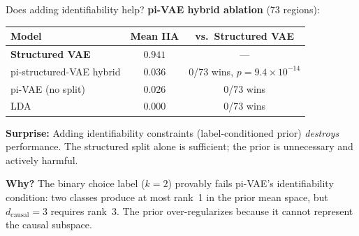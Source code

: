 \documentclass[aspectratio=169,11pt]{beamer}
\begin{document}
\begin{frame}{Does adding identifiability help?}
\textbf{pi-VAE hybrid ablation} (73 regions):

\vspace{0.5em}
\centering
{\small
\begin{tabular}{lcc}
\toprule
\textbf{Model} & \textbf{Mean IIA} & \textbf{vs.\ Structured VAE} \\
\midrule
\textbf{Structured VAE} & $\mathbf{0.941}$ & --- \\
pi-structured-VAE hybrid & $0.036$ & 0/73 wins, $p = 9.4 \times 10^{-14}$ \\
pi-VAE (no split) & $0.026$ & 0/73 wins \\
LDA & $0.000$ & 0/73 wins \\
\bottomrule
\end{tabular}
}

\vspace{0.8em}
\begin{flushleft}
\textbf{Surprise:} Adding identifiability constraints (label-conditioned prior) \emph{destroys} performance. The structured split alone is sufficient; the prior is unnecessary and actively harmful.

\vspace{0.3em}
\textbf{Why?} The binary choice label ($k = 2$) provably fails pi-VAE's identifiability condition: two classes produce at most rank~1 in the prior mean space, but $d_{\text{causal}} = 3$ requires rank~3. The prior over-regularizes because it cannot represent the causal subspace.
\end{flushleft}
\end{frame}
\end{document}
